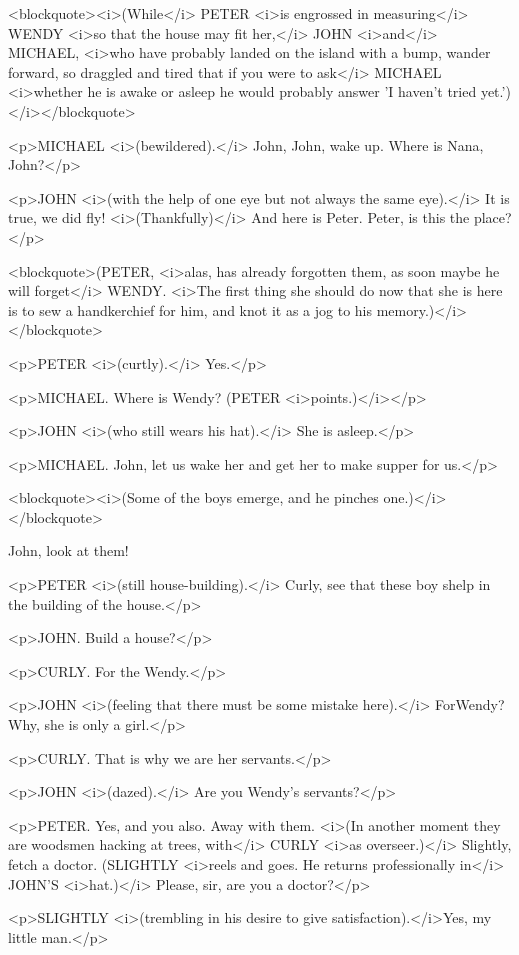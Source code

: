 <blockquote><i>(While</i> PETER <i>is engrossed in measuring</i> WENDY <i>so that the house may fit her,</i> JOHN <i>and</i> MICHAEL, <i>who have probably landed on the island with a bump, wander forward, so draggled and tired that if you were to ask</i> MICHAEL <i>whether he is awake or asleep he would probably answer 'I haven't tried yet.')</i></blockquote>

<p>MICHAEL <i>(bewildered).</i> John, John, wake up. Where is Nana, John?</p>

<p>JOHN <i>(with the help of one eye but not always the same eye).</i> It is true, we did fly! <i>(Thankfully)</i> And here is Peter. Peter, is this the place?</p>

<blockquote>(PETER, <i>alas, has already forgotten them, as soon maybe he will forget</i> WENDY. <i>The first thing she should do now that she is here is to sew a handkerchief for him, and knot it as a jog to his memory.)</i></blockquote>

<p>PETER <i>(curtly).</i> Yes.</p>

<p>MICHAEL. Where is Wendy? (PETER <i>points.)</i></p>

<p>JOHN <i>(who still wears his hat).</i> She is asleep.</p>

<p>MICHAEL. John, let us wake her and get her to make supper for us.</p>

<blockquote><i>(Some of the boys emerge, and he pinches one.)</i></blockquote>

John, look at them! 

<p>PETER <i>(still house-building).</i> Curly, see that these boy shelp in the building of the house.</p>

<p>JOHN. Build a house?</p>

<p>CURLY. For the Wendy.</p>

<p>JOHN <i>(feeling that there must be some mistake here).</i> ForWendy? Why, she is only a girl.</p>

<p>CURLY. That is why we are her servants.</p>

<p>JOHN <i>(dazed).</i> Are you Wendy's servants?</p>

<p>PETER. Yes, and you also. Away with them. <i>(In another moment they are woodsmen hacking at trees, with</i> CURLY <i>as overseer.)</i> Slightly, fetch a doctor. (SLIGHTLY <i>reels and goes. He returns professionally in</i> JOHN'S <i>hat.)</i> Please, sir, are you a doctor?</p>

<p>SLIGHTLY <i>(trembling in his desire to give satisfaction).</i>Yes, my little man.</p>


